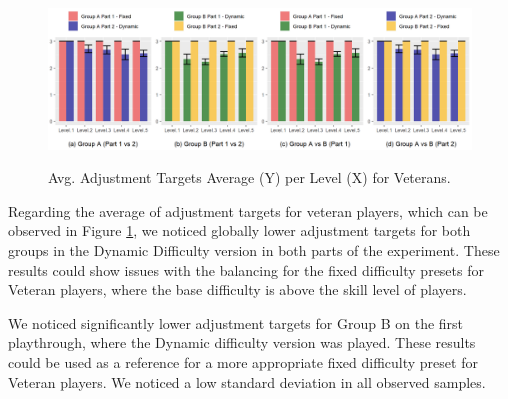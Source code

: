 \begin{figure}[!ht]
    \begin{center}
    \caption{Avg. Adjustment Targets Average (Y) per Level (X) for Veterans.}
        \includegraphics[width=\textwidth]{figures/adjustment_target_level-veteran_players.png}
    \label{fig:result-metric-veteran-adjustment-target-level}
    \end{center}
\end{figure}

Regarding the average of adjustment targets for veteran players, which can be observed in Figure \ref{fig:result-metric-veteran-adjustment-target-level}, we noticed globally lower adjustment targets for both groups in the Dynamic Difficulty version in both parts of the experiment. These results could show issues with the balancing for the fixed difficulty presets for Veteran players, where the base difficulty is above the skill level of players.

We noticed significantly lower adjustment targets for Group B on the first playthrough, where the Dynamic difficulty version was played. These results could be used as a reference for a more appropriate fixed difficulty preset for Veteran players. We noticed a low standard deviation in all observed samples.

